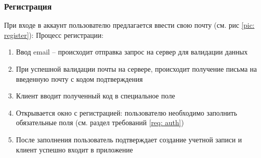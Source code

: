 \documentclass[a4paper,12pt]{article}
\begin{document}
	\subsubsection{Регистрация}
	При входе в аккаунт пользователю предлагается ввести свою почту (см. рис \ref{pic: register}):
	Процесс регистрации:
		\begin{enumerate}
			\item Ввод email -- происходит отправка запрос на сервер для валидации данных
			\item При успешной валидации почты на сервере, происходит получение письма на введенную почту с кодом подтверждения 
			\item Клиент вводит полученный код в специальное поле 
			\item Открывается окно с регистрацией: пользователю необходимо заполнить обязательные поля (см. раздел требований \ref{req: auth})
			\item После заполнения пользователь подтверждает создание учетной записи и клиент успешно входит в приложение
		\end{enumerate}
\end{document}
